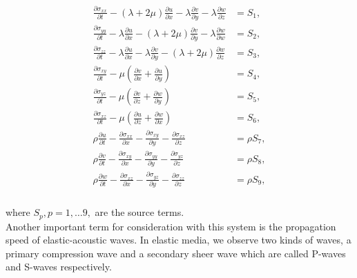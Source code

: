 \begin{align}
    \begin{split}
    \frac{\partial \sigma_{xx}}{\partial t} - \left(\lambda  + 2\mu\right)\frac{\partial u}{\partial x} - \lambda \frac{\partial v}{\partial y} - \lambda\frac{\partial w}{\partial z} &= S_1, \\    
    \frac{\partial \sigma_{yy}}{\partial t} - \lambda \frac{\partial u}{\partial x} - \left( \lambda + 2 \mu \right)\frac{\partial v}{\partial y} - \lambda \frac{\partial w}{\partial w} &= S_2, \\
    \frac{\partial \sigma_{zz}}{\partial t} - \lambda \frac{\partial u}{\partial x} - \lambda \frac{\partial v}{\partial y} - \left(\lambda + 2\mu\right)\frac{\partial w}{\partial z} &= S_3, \\
    \frac{\partial \sigma_{xy}}{\partial t} - \mu \left(\frac{\partial v}{\partial x} + \frac{\partial u}{\partial y}\right) &= S_4, \\ 
    \frac{\partial \sigma_{yz}}{\partial t} - \mu \left(\frac{\partial v}{\partial z} + \frac{\partial w}{\partial y}\right) &= S_5, \\
    \frac{\partial \sigma_{xz}}{\partial t} - \mu \left(\frac{\partial u}{\partial z} + \frac{\partial w}{\partial x}\right) &= S_6, \\
    \rho \frac{\partial u}{\partial t} - \frac{\partial \sigma_{xx}}{\partial x} - \frac{\partial \sigma_{xy}}{\partial y} - \frac{\partial \sigma_{xz}}{\partial z} &= \rho S_7, \\
    \rho \frac{\partial v}{\partial t} - \frac{\partial \sigma_{xy}}{\partial x} - \frac{\partial \sigma_{yy}}{\partial y} - \frac{\partial \sigma_{yz}}{\partial z} &= \rho S_8, \\
    \rho \frac{\partial w}{\partial t} - \frac{\partial \sigma_{xz}}{\partial x} - \frac{\partial \sigma_{yz}}{\partial y} - \frac{\partial \sigma_{zz}}{\partial z} &= \rho S_9, \\
\end{split}
\label{eq:setofequations}
\end{align}

where $S_p, p = 1,\dots9,$ are the source terms. \\

Another important term for consideration with this system is the propagation speed of elastic-acoustic waves. In elastic media, we 
observe two kinds of waves, a primary compression wave and a secondary sheer wave which are called P-waves and S-waves respectively.\\

